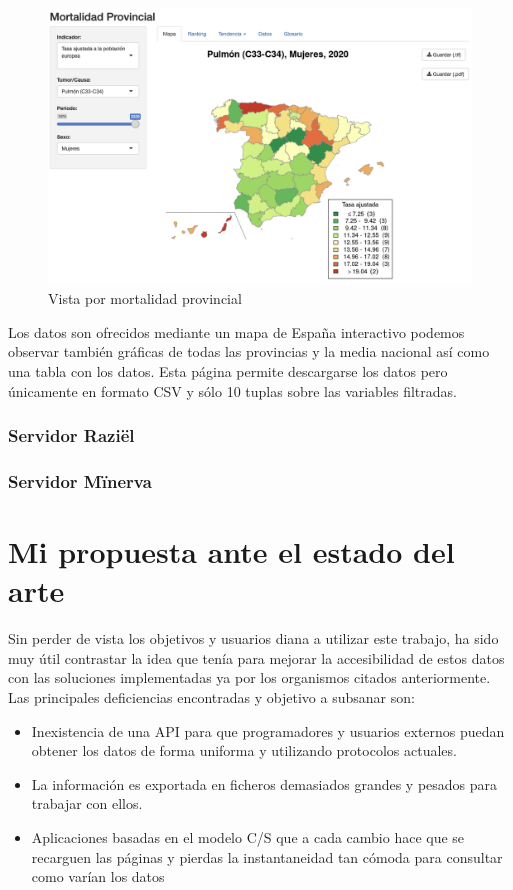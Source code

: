 \begin{figure}[]
	\centering
	\includegraphics[scale=0.5]{doc/logos/imgs/ariadna2.png}
	\caption{ \cite{ariadna} Vista por mortalidad provincial }
    \label{fig:worst_f_value}
\end{figure}

Los datos son ofrecidos mediante un mapa de España interactivo podemos observar también gráficas de todas las
provincias y la media nacional así como una tabla con los datos. Esta página permite descargarse los datos pero
únicamente en formato CSV y sólo 10 tuplas sobre las variables filtradas.

\subsubsection{Servidor Raziël}

\subsubsection{Servidor Mïnerva}


\section{Mi propuesta ante el estado del arte}
Sin perder de vista los objetivos y usuarios diana a utilizar este trabajo, ha sido muy útil contrastar la idea
que tenía para mejorar la accesibilidad de estos datos con las soluciones implementadas ya por los
organismos citados anteriormente.
Las principales deficiencias encontradas y objetivo a subsanar son:
\begin{itemize}
    \item Inexistencia de una API para que programadores y usuarios externos puedan obtener los datos
    de forma uniforma y utilizando protocolos actuales.
    \item La información es exportada en ficheros demasiados grandes y pesados para trabajar con ellos.
    \item Aplicaciones basadas en el modelo C/S que a cada cambio hace que se recarguen las páginas y pierdas
    la instantaneidad tan cómoda para consultar como varían los datos
\end{itemize}
